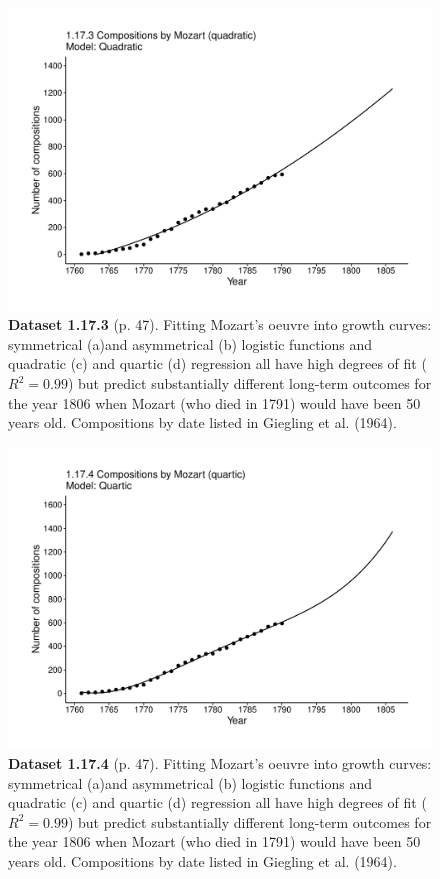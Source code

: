 \documentclass[aps,rmp,preprint,superscriptaddress,10pt,onecolumn]{article}
\begin{document}
\clearpage
\begin{figure}[h]
\includegraphics[width=\textwidth]{output/figs-ggplot/1.17.3.pdf}
\caption*{\textbf{Dataset 1.17.3} (p. 47). Fitting Mozart's oeuvre into growth curves: symmetrical (a)and asymmetrical (b) logistic functions and quadratic (c) and quartic (d) regression all have high degrees of fit ($R^2=0.99$) but predict substantially different long-term outcomes for the year 1806 when Mozart (who died in 1791) would have been 50 years old. Compositions by date listed in Giegling et al. (1964).}
\end{figure}
	
\clearpage
\begin{figure}[h]
\includegraphics[width=\textwidth]{output/figs-ggplot/1.17.4.pdf}
\caption*{\textbf{Dataset 1.17.4} (p. 47). Fitting Mozart's oeuvre into growth curves: symmetrical (a)and asymmetrical (b) logistic functions and quadratic (c) and quartic (d) regression all have high degrees of fit ($R^2=0.99$) but predict substantially different long-term outcomes for the year 1806 when Mozart (who died in 1791) would have been 50 years old. Compositions by date listed in Giegling et al. (1964).}
\end{figure}
	
\end{document}
